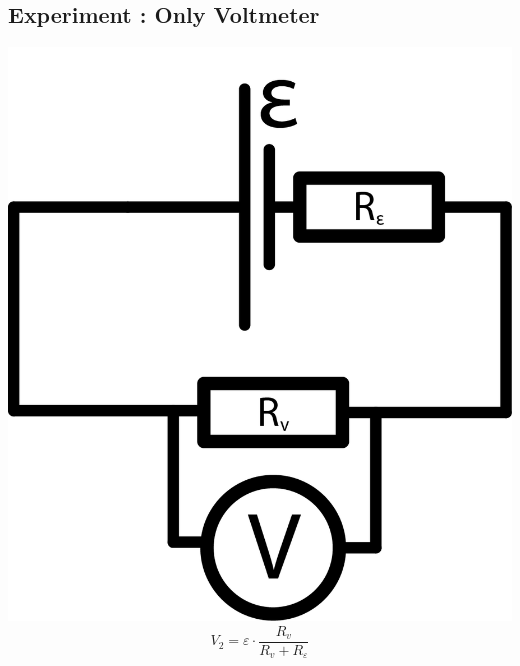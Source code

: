 \documentclass[12pt]{memoir}
\begin{document}
    \newpage

    \subsection{Experiment : Only Voltmeter}\label{subsec:experiment-2}
    \includegraphics[width=\linewidth]{images/schemes/OnlyVoltmeter.png}
    \begin{equation*}
        V_2 = \varepsilon \cdot \frac{R_v}{R_v + R_\varepsilon}
    \end{equation*}

    \newpage

\end{document}
